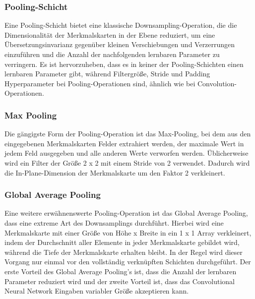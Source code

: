 \documentclass[paper=A4,pagesize=auto,12pt,headinclude=true,footinclude=true,BCOR=0mm,DIV=calc]{scrartcl}
\begin{document}
\subsubsection{Pooling-Schicht}
Eine Pooling-Schicht bietet eine klassische Downsampling-Operation, die die Dimensionalität der Merkmalskarten in der Ebene reduziert, um eine Übersetzungsinvarianz gegenüber kleinen Verschiebungen und Verzerrungen einzuführen und die Anzahl der nachfolgenden lernbaren Parameter zu verringern. Es ist hervorzuheben, dass es in keiner der Pooling-Schichten einen lernbaren Parameter gibt, während Filtergröße, Stride und Padding Hyperparameter bei Pooling-Operationen sind, ähnlich wie bei Convolution-Operationen. \cite{cnn2}

\subsubsection{Max Pooling}
Die gängigste Form der Pooling-Operation ist das Max-Pooling, bei dem aus den eingegebenen Merkmalskarten Felder extrahiert werden, der maximale Wert in jedem Feld ausgegeben und alle anderen Werte verworfen werden. Üblicherweise wird ein Filter der Größe 2 x 2 mit einem Stride von 2 verwendet. Dadurch wird die In-Plane-Dimension der Merkmalskarte um den Faktor 2 verkleinert. \cite{cnn2}

\subsubsection{Global Average Pooling}
Eine weitere erwähnenswerte Pooling-Operation ist das Global Average Pooling, dass eine extreme Art des Downsamplings durchführt. Hierbei wird eine Merkmalskarte mit einer Größe von Höhe x Breite in ein 1 x 1 Array verkleinert, indem der Durchschnitt aller Elemente in jeder Merkmalskarte gebildet wird, während die Tiefe der Merkmalskarte erhalten bleibt. In der Regel wird dieser Vorgang nur einmal vor den vollständig verknüpften Schichten durchgeführt. Der erste Vorteil des Global Average Pooling’s ist, dass die Anzahl der lernbaren Parameter reduziert wird und der zweite Vorteil ist, dass das Convolutional Neural Network Eingaben variabler Größe akzeptieren kann. \cite{cnn2}
\end{document}
